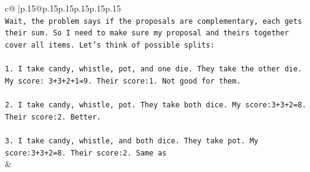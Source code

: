 \documentclass{article}
\begin{document}
{\begin{supertabular}{c@{$\;$}|p{.15\linewidth}@{}p{.15\linewidth}p{.15\linewidth}p{.15\linewidth}p{.15\linewidth}p{.15\linewidth}}
{{{\\ 
\texttt{Wait, the problem says if the proposals are complementary, each gets their sum. So I need to make sure my proposal and theirs together cover all items. Let's think of possible splits:} \\
\\ 
\texttt{1. I take candy, whistle, pot, and one die. They take the other die. My score: 3+3+2+1=9. Their score:1. Not good for them.} \\
\\ 
\texttt{2. I take candy, whistle, pot. They take both dice. My score:3+3+2=8. Their score:2. Better.} \\
\\ 
\texttt{3. I take candy, whistle, and both dice. They take pot. My score:3+3+2=8. Their score:2. Same as} \\
            }
        }
    }
    & \\ \\


\end{supertabular}}
\end{document}

